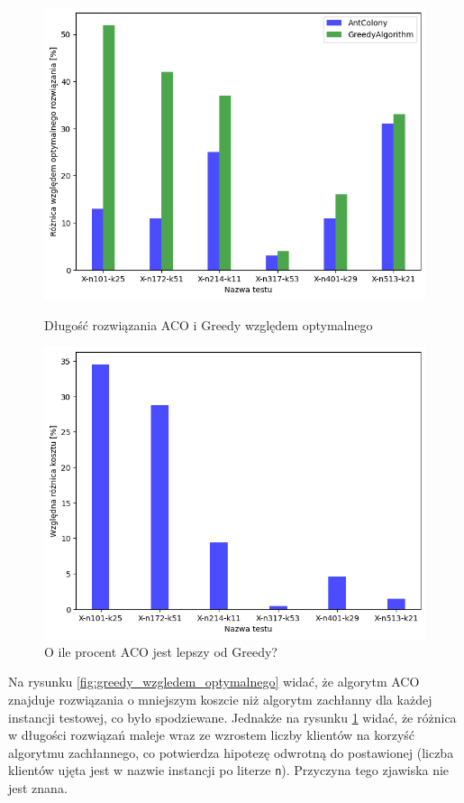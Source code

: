 \documentclass{article}
\begin{document}
\begin{figure}[H]
    \centering
    \begin{minipage}{0.48\textwidth}
        \centering
        \includegraphics[width=\linewidth]{img/greed_wzgledem_optymalnego.png}
        \caption{Długość rozwiązania ACO i Greedy względem optymalnego}
        \label{fig:greedy_wzgledem_optymalnego}
    \end{minipage}
    \hfill
    \begin{minipage}{0.48\textwidth}
        \centering
        \includegraphics[width=\linewidth]{img/greedy_wzgledem_zwyklego.png}
        \caption{O ile procent ACO jest lepszy od Greedy?}
        \label{fig:greedy_wzgledem_zwyklego}
    \end{minipage}
\end{figure}
\noindent Na rysunku \ref{fig:greedy_wzgledem_optymalnego} widać, że algorytm ACO znajduje rozwiązania o mniejszym koszcie niż algorytm zachłanny dla każdej instancji testowej, co było spodziewane.
Jednakże na rysunku \ref{fig:greedy_wzgledem_zwyklego} widać, że różnica w długości rozwiązań maleje wraz ze wzrostem liczby klientów na korzyść algorytmu zachłannego, co potwierdza hipotezę odwrotną do postawionej (liczba klientów ujęta jest w nazwie instancji po literze \texttt{n}).  Przyczyna tego zjawiska nie jest znana.
\end{document}
